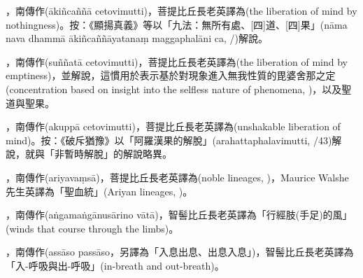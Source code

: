 \startitemgroup[noteitems]
\item{}，南傳作(ākiñcaññā cetovimutti)，菩提比丘長老英譯為(the liberation of mind by nothingness)。按：《顯揚真義》等以「九法：無所有處、[四]道、[四]果」(nāma nava dhammā ākiñcaññāyatanaṃ maggaphalāni ca, /)解說。
\stopitemgroup

\startitemgroup[noteitems]
\item{}，南傳作(suññatā cetovimutti)，菩提比丘長老英譯為(the liberation of mind by emptiness)，並解說，這慣用於表示基於對現象進入無我性質的毘婆舍那之定(concentration based on insight into the selfless nature of phenomena, )，以及聖道與聖果。
\stopitemgroup

\startitemgroup[noteitems]
\item{}，南傳作(akuppā cetovimutti)，菩提比丘長老英譯為(unshakable liberation of mind)。按：《破斥猶豫》以「阿羅漢果的解脫」(arahattaphalavimutti, /43)解說，就與「非暫時解脫」的解說略異。
\stopitemgroup

\startitemgroup[noteitems]
\item{}，南傳作(ariyavaṃsā)，菩提比丘長老英譯為(noble lineages, )，Maurice Walshe先生英譯為「聖血統」(Ariyan lineages, )。
\stopitemgroup

\startitemgroup[noteitems]
\item{}，南傳作(aṅgamaṅgānusārino vātā)，智髻比丘長老英譯為「行經肢(手足)的風」(winds that course through the limbs)。
\stopitemgroup

\startitemgroup[noteitems]
\item{}，南傳作(assāso passāso，另譯為「入息出息、出息入息」)，智髻比丘長老英譯為「入-呼吸與出-呼吸」(in-breath and out-breath)。
\stopitemgroup

